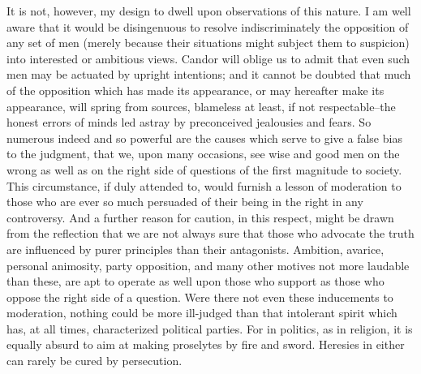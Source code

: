 It is not, however, my design to dwell upon observations of this nature. I am well aware that it would be disingenuous to resolve indiscriminately the opposition of any set of men (merely because their situations might subject them to suspicion) into interested or ambitious views. Candor will oblige us to admit that even such men may be actuated by upright intentions; and it cannot be doubted that much of the opposition which has made its appearance, or may hereafter make its appearance, will spring from sources, blameless at least, if not respectable--the honest errors of minds led astray by preconceived jealousies and fears. So numerous indeed and so powerful are the causes which serve to give a false bias to the judgment, that we, upon many occasions, see wise and good men on the wrong as well as on the right side of questions of the first magnitude to society. This circumstance, if duly attended to, would furnish a lesson of moderation to those who are ever so much persuaded of their being in the right in any controversy. And a further reason for caution, in this respect, might be drawn from the reflection that we are not always sure that those who advocate the truth are influenced by purer principles than their antagonists. Ambition, avarice, personal animosity, party opposition, and many other motives not more laudable than these, are apt to operate as well upon those who support as those who oppose the right side of a question. Were there not even these inducements to moderation, nothing could be more ill-judged than that intolerant spirit which has, at all times, characterized political parties. For in politics, as in religion, it is equally absurd to aim at making proselytes by fire and sword. Heresies in either can rarely be cured by persecution.

